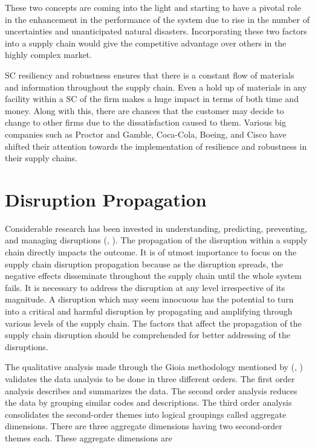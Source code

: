 These two concepts are coming into the light and  starting to have a pivotal role in the enhancement in the performance of the system due to rise in the number of uncertainties and unanticipated natural disasters. Incorporating these two factors into a supply chain would give the competitive advantage over others in the highly complex market.

SC resiliency and robustness ensures that there is a constant flow of materials and information throughout the supply chain. Even a hold up of materials in any facility within a SC of the firm makes a huge impact in terms of both time and money. Along with this, there are chances that the customer may decide to change to other firms due to the dissatisfaction caused to them. Various big companies such as Proctor and Gamble, Coca-Cola, Boeing, and Cisco have shifted their attention towards the implementation of resilience and robustness in their supply chains. 

\newpage
\section{Disruption Propagation}
Considerable research has been invested in understanding, predicting, preventing, and managing disruptions  (\citeauthor{Ivanov2016}, \citeyear{Ivanov2016}). The propagation of the disruption within a supply chain directly impacts the outcome. It is of utmost importance to focus on the supply chain disruption propagation because as the disruption spreads, the negative effects disseminate throughout the supply chain until the whole system fails. It is necessary to address the disruption at any level irrespective of its magnitude. A disruption which may seem innocuous has the potential to turn into a critical and harmful disruption by propagating and amplifying through various levels of the supply chain. The factors that affect the propagation of the supply chain disruption should be comprehended for better addressing of the disruptions.

The qualitative analysis made through the Gioia methodology mentioned by (\citeauthor{Scheibe2017}, \citeyear{Scheibe2017}) validates the data analysis to be done in three different orders. The first order analysis describes and summarizes the data. The second order analysis reduces the data by grouping similar codes and descriptions. The third order analysis consolidates the second-order themes into logical groupings called aggregate dimensions. There are three aggregate dimensions having two second-order themes each. These aggregate dimensions are 

